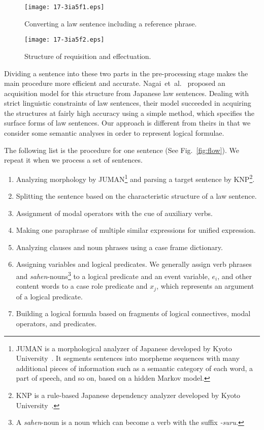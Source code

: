 \documentclass[english]{jnlp_1.4}
\begin{document}
\begin{figure}[b]
\begin{center}
\texttt{[image: 17-3ia5f1.eps]}
\end{center}
\caption{Converting a law sentence including a reference phrase.}
\label{fig:prev_problem}
\end{figure}
\begin{figure}[b]
\begin{center}
\texttt{[image: 17-3ia5f2.eps]}
\end{center}
\caption{Structure of requisition and effectuation.}
\label{fig:youken}
\end{figure}

Dividing a sentence into these two parts in the pre-processing stage makes
the main procedure more efficient and accurate.
Nagai~et~al.~\cite{nagai95} proposed an acquisition model for this
structure from Japanese law sentences.
Dealing with strict linguistic constraints of law sentences, their model
succeeded in acquiring the structures at fairly high accuracy using a simple
method, which specifies the surface forms of law sentences.
Our approach is different from theirs in that we consider some semantic
analyses in order to represent logical formulae.


The following list is the procedure for one sentence (See Fig.~\ref{fig:flow}).
We repeat it when we process a set of sentences.
\begin{enumerate}
 \item Analyzing morphology by JUMAN\footnote{JUMAN is a morphological
       analyzer of Japanese developed by Kyoto
       University~\cite{kurohashi94juman}. It segments sentences into
       morpheme 
       sequences with many additional pieces of information such as
       a semantic category of each word, a part of speech, and so on, 
       based on a hidden
       Markov model.} and parsing
       a target sentence by KNP\footnote{KNP is a rule-based Japanese
       dependency analyzer developed by Kyoto University~\cite{kurohashi94knp}.}.
       
 \item Splitting the sentence based on the characteristic structure of
       a law sentence.
 \item Assignment of modal operators with the cue of auxiliary verbs. 
 \item Making one paraphrase of multiple similar expressions for 
       unified expression.
 \item Analyzing clauses and noun phrases using a case frame dictionary.
 \item Assigning variables and logical predicates.  We generally assign verb phrases and
       {\it sahen}-nouns\footnote{A {\it sahen}-noun is a noun which can
       become a verb with the suffix {\it -suru}.} to a logical
       predicate and an event variable, $e_i$,
       and other content words to a case role predicate and $x_j$, which
       represents an argument of a logical predicate.
 \item Building a logical formula based on fragments of logical
       connectives, modal operators, and predicates.
\end{enumerate}
\end{document}

